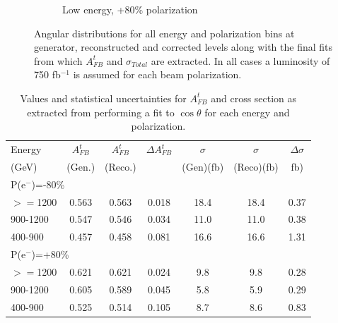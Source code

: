 \begin{figure}[]
\begin{subfigure}[]{0.5\linewidth}
    \caption{Low energy, +80\% polarization} 
    \vspace{4ex}
  \end{subfigure}
  \caption[Final corrected angular distributions from which $A_{FB}^t$ and $\sigma_{Total}$ are extracted]{Angular distributions for all energy and polarization bins at generator, reconstructed and corrected levels along with the final fits from which $A_{FB}^t$ and $\sigma_{Total}$ are extracted. In all cases a luminosity of 750 fb$^{-1}$ is assumed for each beam polarization.}
  \label{fig:finalfits}
\end{figure}

\begin{table}
  \centering
  \begin{tabular}{l|c|c|c|c|c|c}
    \toprule
     Energy & $A_{FB}^t$ & $A_{FB}^t$  & $\Delta A^t_{FB}$ &  $\sigma$  &  $\sigma$  &  $\Delta\sigma$ \\
     (GeV) & (Gen.) & (Reco.) &  &  (Gen)(fb) &  (Reco)(fb) &  fb)\\
     \midrule
     \midrule
     \multicolumn{7}{l}{P(e$^-$)=-80\%} \\
     \midrule
     \midrule
    $>=$1200  & 0.563 & 0.563 & 0.018 & 18.4 & 18.4 & 0.37 \\
    \midrule
    900-1200  & 0.547 & 0.546 & 0.034 & 11.0 & 11.0 & 0.38 \\
    \midrule
    400-900   & 0.457 & 0.458 & 0.081 & 16.6 & 16.6 & 1.31 \\
    \midrule
    \midrule
   \multicolumn{7}{l}{ P(e$^-$)=+80\%}\\
    \midrule
    \midrule
    $>=$1200  & 0.621 & 0.621 & 0.024 & 9.8 & 9.8 & 0.28 \\
    \midrule
    900-1200  & 0.605 & 0.589 & 0.045 & 5.8 & 5.9 & 0.29 \\
    \midrule
    400-900   & 0.525 & 0.514 & 0.105 & 8.7 & 8.6 & 0.83 \\
    \bottomrule
  \end{tabular}
  \caption{Values and statistical uncertainties for $A_{FB}^t$ and cross section as extracted from performing a fit to $\cos\theta$ for each energy and polarization.}
  \label{tab:finalfitresults}
\end{table}


